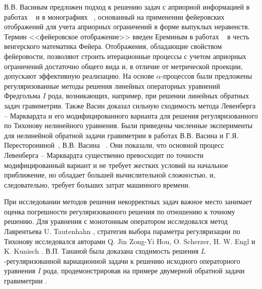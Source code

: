 {В.В. Васиным предложен подход к решению задач с априорной информацией в работах ~\cite{Vas1982, Vas1988} и в монографиях ~\cite{VasAge1993, VasEre2005}, основанный на применении фейеровских отображений для учета априорных ограничений в форме выпуклых неравенств. Термин <<фейеровское отображение>> введен Ереминым в работах ~\cite{Ere1965, Ere1966, Ere1968} в честь венгерского математика Фейера. Отображения, обладающие свойством фейеровости, позволяют строить итерационные процессы с учетом априорных ограничений достаточно общего вида и, в отличие от метрической проекции, допускают эффективную реализацию. На основе $\alpha$-процессов были предложены регуляризованные методы решения линейных операторных уравнений Фредгольма $I$ рода, возникающих, например, при решении линейных обратных задач гравиметрии. Также Васин доказал сильную сходимость метода Левенберга -- Марквардта и его модифицированного варианта для решения регуляризованного по Тихонову нелинейного уравнения. Были приведены численные эксперименты для нелинейной обратной задачи гравиметрии в работах В.В. Васина и Г.Я. Пересторониной~\cite{VasPer2011}, В.В. Васина ~\cite{Vas2012}. Они показали, что основной процесс Левенберга -- Марквардта существенно превосходит по точности модифицированный вариант и не требует жестких условий на начальное приближение, но обладает большей вычислительной сложностью, и, следовательно, требует больших затрат машинного времени.

При исследовании методов решения некорректных задач важное место занимает оценка погрешности регуляризованного решения по отношению к точному решению. Для уравнения с монотонным оператором исследовался метод Лаврентьева U. Tautenhahn \cite{Tau2002,Tau2004}, стратегия выбора параметра регуляризации по Тихонову исследовался авторами Q. Jin Zong-Yi Hou, O. Scherzer, H. W. Engl и K. Kunisch \cite{JinZon1993,JinZon1997,SchEngKun1993}. В.П. Тананой была доказана сходимость решения $L$-регуляризованной вариационной задачи к решению исходного операторного уравнения $I$ рода, продемонстрировав на примере двумерной обратной задачи гравиметрии \cite{Tan2003_2}.
}

